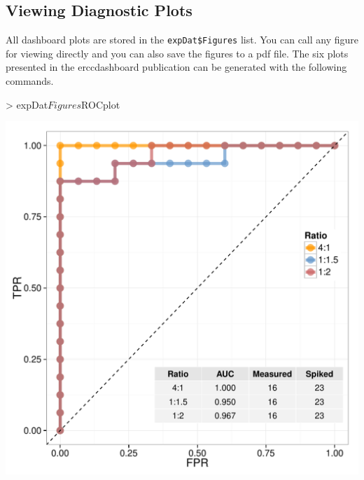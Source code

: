 \documentclass{article}
\begin{document}
\subsection{Viewing Diagnostic Plots}
All dashboard plots are stored in the \verb|expDat$Figures|
list. You can call any figure for viewing directly and you can 
also save the figures to a pdf file. The six plots presented in the 
erccdashboard publication can be generated with the following commands.
\begin{center}
\begin{Schunk}
\begin{Sinput}
> expDat$Figures$ROCplot
\end{Sinput}
\end{Schunk}
\includegraphics{erccdashboardVignette-printPanelA}
\end{center}
\clearpage
\end{document}
